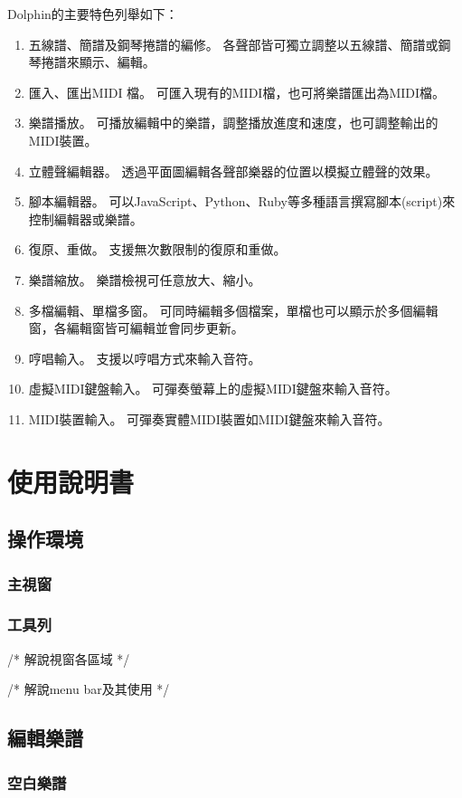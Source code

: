 \documentclass[12pt,a4paper,oneside]{report}
\begin{document}
Dolphin的主要特色列舉如下：
\begin{enumerate}
\item 五線譜、簡譜及鋼琴捲譜的編修。
      各聲部皆可獨立調整以五線譜、簡譜或鋼琴捲譜來顯示、編輯。
\item 匯入、匯出MIDI 檔。
      可匯入現有的MIDI檔，也可將樂譜匯出為MIDI檔。
\item 樂譜播放。
      可播放編輯中的樂譜，調整播放進度和速度，也可調整輸出的MIDI裝置。
\item 立體聲編輯器。
      透過平面圖編輯各聲部樂器的位置以模擬立體聲的效果。
\item 腳本編輯器。
      可以JavaScript、Python、Ruby等多種語言撰寫腳本(script)來控制編輯器或樂譜。
\item 復原、重做。
      支援無次數限制的復原和重做。
\item 樂譜縮放。
      樂譜檢視可任意放大、縮小。
\item 多檔編輯、單檔多窗。
      可同時編輯多個檔案，單檔也可以顯示於多個編輯窗，各編輯窗皆可編輯並會同步更新。
\item 哼唱輸入。
      支援以哼唱方式來輸入音符。
\item 虛擬MIDI鍵盤輸入。
      可彈奏螢幕上的虛擬MIDI鍵盤來輸入音符。
\item MIDI裝置輸入。
      可彈奏實體MIDI裝置如MIDI鍵盤來輸入音符。 
\end{enumerate}

\chapter{使用說明書}
\section{操作環境}
\subsection{主視窗}
\subsection{工具列}
/* 
解說視窗各區域
*/

/* 
解說menu bar及其使用
*/
\section{編輯樂譜}
   \subsection{空白樂譜}
\end{document}
